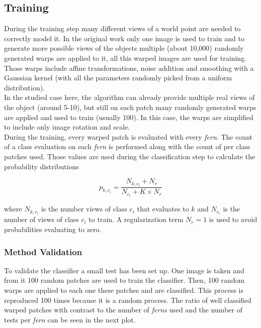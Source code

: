 \subsection{Training}
\label{sub:training}

During the training step many different views of a world point are needed to correctly model it. In the original work \cite{Ozuysal2010} only one image is used to train and to generate more possible views of the objects multiple (about 10,000) randomly generated warps are applied to it, all this warped images are used for training. Those warps include affine transformations, noise addition and smoothing with a Gaussian kernel (with all the parameters randomly picked from a uniform distribution).\\

In the studied case here, the algorithm can already provide multiple real views of the object (around 5-10), but still on each patch many randomly generated warps are applied and used to train (usually 100). In this case, the warps are simplified to include only image rotation and scale.\\

During the training, every warped patch is evaluated with every \textit{fern}. The count of a class evaluation on each \textit{fern} is performed along with the count of per class patches used. Those values are used during the classification step to calculate the probability distributions

\begin{equation}
  p_{k,c_i} = \frac{N_{k,c_i} + N_r}{N_{c_i} + K \times N_r}
\end{equation}

where $N_{k,c_i}$ is the number views of class $c_i$ that evaluates to $k$ and $N_{c_i}$ is the number of views of class $c_i$ to train. A regularization term $N_r = 1$ is used to avoid probabilities evaluating to zero.\\


\subsubsection{Method Validation}
\label{ssub:ferns_method_validation}

To validate the classifier a small test has been set up. One image is taken and from it 100 random patches are used to train the classifier. Then, 100 random warps are applied to each one these patches and are classified. This process is reproduced 100 times because it is a random process. The ratio of well classified warped patches with contrast to the number of \textit{ferns} used and the number of tests per \textit{fern} can be seen in the next plot.


